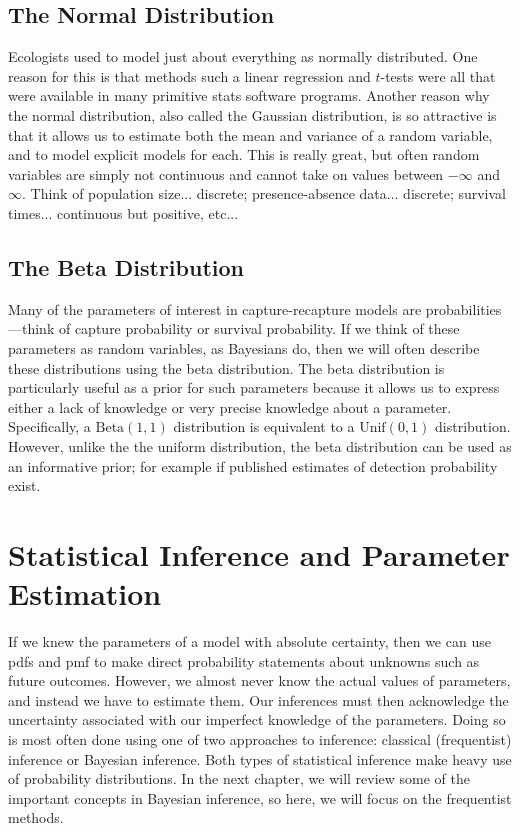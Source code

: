 \subsection{The Normal Distribution}

Ecologists used to model just about everything as normally
distributed. One reason for this is that methods such a linear
regression and $t$-tests were all that were available in many
primitive stats software programs. Another reason why the normal
distribution, also called the Gaussian distribution, is so attractive
is that it allows us to estimate both the mean and variance of a
random variable, and to model explicit models for each. This is really
great, but often random variables are simply not continuous and cannot
take on values between $-\infty$ and $\infty$. Think of
population size... discrete; presence-absence data... discrete;
survival times... continuous but positive, etc...


\subsection{The Beta Distribution}

Many of the parameters of interest in capture-recapture models are
probabilities---think of capture probability or survival
probability. If we think of these parameters as random variables,
as Bayesians do, then we will often describe these distributions using
the beta distribution. The beta distribution is particularly useful as
a prior for such parameters because it allows us to express either a
lack of knowledge or very precise knowledge about a
parameter. Specifically, a $\text{Beta}(1,1)$ distribution is
equivalent to a $\text{Unif}(0, 1)$ distribution. However, unlike the
the uniform distribution, the beta distribution can be used as an
informative prior; for example if published estimates of detection
probability exist.








\section{Statistical Inference and Parameter Estimation}

If we knew the parameters of a model with absolute certainty, then
we can use pdfs and pmf to make direct
probability statements about unknowns such as future outcomes. However, we
almost never know the actual values of parameters, and instead we have
to estimate them. Our inferences must then acknowledge the uncertainty
associated with our imperfect knowledge of the parameters. Doing so is
most often done using one of two approaches to inference:
classical (frequentist) inference or Bayesian
inference. Both types of statistical inference make heavy use of
probability distributions. In the next chapter, we will review some of
the important concepts in Bayesian inference, so here, we will
focus on the frequentist methods.

